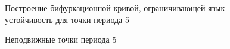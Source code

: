 \documentclass[12pt, a4paper]{article}
\begin{document}
\begin{figure}[H]
	\caption{Построение бифуркационной кривой, ограничивающей язык устойчивость для точки периода 5}
\end{figure}

\begin{figure}[H]
	\caption{Неподвижные точки периода 5}
\end{figure}
\end{document}
